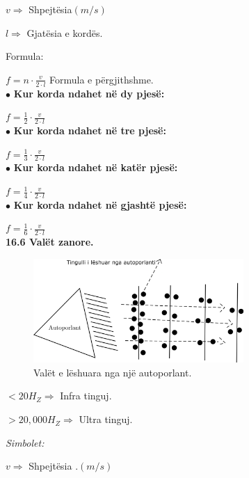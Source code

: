 \documentclass[twocolumn]{article}
\begin{document}
$v \Rightarrow$ Shpejtësia$(m/s)$

$l \Rightarrow $ Gjatësia e kordës.



\begin{center}
	Formula:
\end{center}

$f= n \cdot \frac{v}{2\cdot l}$ Formula e përgjithshme.\\




 $\bullet$  \textbf{ Kur korda ndahet në dy pjesë:}
 
 $f=\frac{1}{2} \cdot \frac{v}{2 \cdot l}$\\
 
  $\bullet$  \textbf{ Kur korda ndahet në tre pjesë:}
  
   $f=\frac{1}{3} \cdot \frac{v}{2 \cdot l}$\\
   
     $\bullet$  \textbf{ Kur korda ndahet në katër pjesë:}
 
    $f=\frac{1}{4} \cdot \frac{v}{2 \cdot l}$\\
    
    
         $\bullet$  \textbf{ Kur korda ndahet në gjashtë pjesë:}
    
     $f=\frac{1}{6} \cdot \frac{v}{2 \cdot l}$\\

\textbf{16.6 Valët zanore.}

	\begin{figure}[h]
	\includegraphics[width=80mm]{Imazhet/Valetzanore.png}
	\caption{Valët e lëshuara nga një autoporlant.}
	\label{fig:boat1}
\end{figure}

$<20 H_Z \Rightarrow $ Infra tinguj.

$>20,000 H_Z \Rightarrow $ Ultra tinguj.

\begin{center}
	\textit{Simbolet:}
\end{center}

$v \Rightarrow$ Shpejtësia .$(m/s)$
\end{document}
